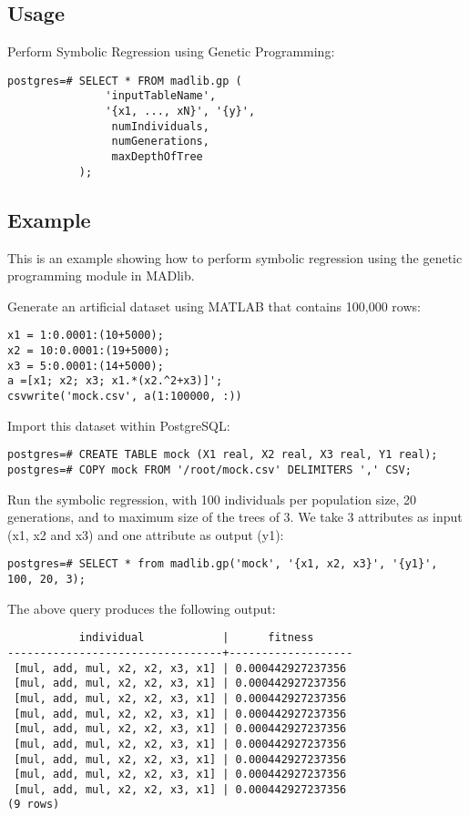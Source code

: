 \subsection*{Usage}
Perform Symbolic Regression using Genetic Programming:
\begin{verbatim}
postgres=# SELECT * FROM madlib.gp (
               'inputTableName', 
               '{x1, ..., xN}', '{y}', 
                numIndividuals, 
                numGenerations, 
                maxDepthOfTree
           );
\end{verbatim}

\subsection*{Example}
This is an example showing how to perform symbolic regression using the genetic programming module in MADlib. 

\vspace{\baselineskip}
{\raggedleft Generate an artificial dataset using MATLAB that contains 100,000 rows:}

\lstset{language=Matlab}
\lstset{tabsize=4}
\begin{lstlisting}
x1 = 1:0.0001:(10+5000);
x2 = 10:0.0001:(19+5000);
x3 = 5:0.0001:(14+5000);
a =[x1; x2; x3; x1.*(x2.^2+x3)]';
csvwrite('mock.csv', a(1:100000, :))
\end{lstlisting}

{\raggedleft Import this dataset within PostgreSQL:}
\begin{verbatim}
postgres=# CREATE TABLE mock (X1 real, X2 real, X3 real, Y1 real);
postgres=# COPY mock FROM '/root/mock.csv' DELIMITERS ',' CSV;
\end{verbatim}

{\raggedleft Run the symbolic regression, with 100 individuals per population size, 20 generations, and to maximum size of the trees of 3. We take 3 attributes as input (x1, x2 and x3) and one attribute as output (y1):}

\begin{verbatim}
postgres=# SELECT * from madlib.gp('mock', '{x1, x2, x3}', '{y1}', 100, 20, 3);
\end{verbatim}

{\raggedleft The above query produces the following output:}
\begin{verbatim}
           individual            |      fitness
---------------------------------+-------------------
 [mul, add, mul, x2, x2, x3, x1] | 0.000442927237356
 [mul, add, mul, x2, x2, x3, x1] | 0.000442927237356
 [mul, add, mul, x2, x2, x3, x1] | 0.000442927237356
 [mul, add, mul, x2, x2, x3, x1] | 0.000442927237356
 [mul, add, mul, x2, x2, x3, x1] | 0.000442927237356
 [mul, add, mul, x2, x2, x3, x1] | 0.000442927237356
 [mul, add, mul, x2, x2, x3, x1] | 0.000442927237356
 [mul, add, mul, x2, x2, x3, x1] | 0.000442927237356
 [mul, add, mul, x2, x2, x3, x1] | 0.000442927237356
(9 rows)
\end{verbatim}

